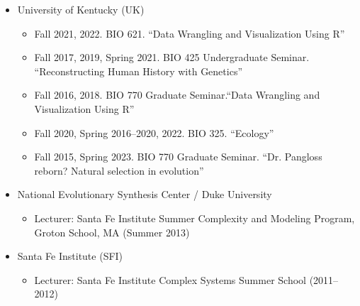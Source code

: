 \documentclass[11pt]{article}
\begin{document}
  \begin{itemize}
  \item University of Kentucky (UK)
    \begin{itemize}
    \item Fall 2021, 2022. BIO 621. ``Data Wrangling and Visualization Using R''
    \item Fall 2017, 2019, Spring 2021. BIO 425 Undergraduate Seminar. ``Reconstructing Human History with Genetics''
    \item Fall 2016, 2018. BIO 770 Graduate Seminar.``Data Wrangling and Visualization Using R''
    \item Fall 2020, Spring 2016--2020, 2022. BIO 325. ``Ecology''
    \item Fall 2015, Spring 2023. BIO 770 Graduate Seminar. ``Dr. Pangloss reborn? Natural selection in evolution''
    \end{itemize}
  \item National Evolutionary Synthesis Center / Duke University
    \begin{itemize}
    \item Lecturer: Santa Fe Institute Summer Complexity and Modeling Program, \\
      Groton School, MA (Summer 2013)
    \end{itemize}
  \item Santa Fe Institute (SFI)
    \begin{itemize}
    \item Lecturer: Santa Fe Institute Complex Systems Summer School (2011--2012)
    \end{itemize}
  \end{itemize}
  
\end{document}
